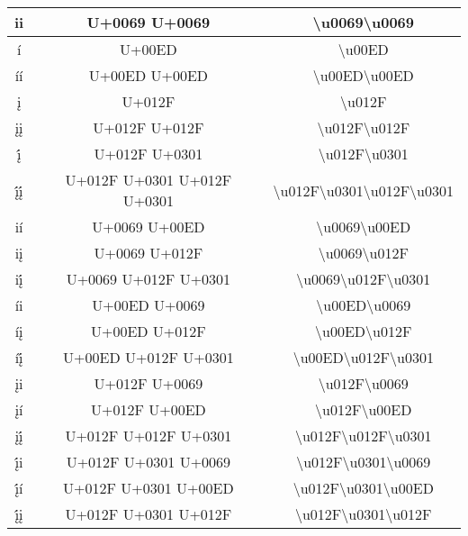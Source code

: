 \begin{longtable}{|c|c|c|}
ii & U+0069 U+0069  & \textbackslash{}u0069\textbackslash{}u0069 \\ \hline
í & U+00ED & \textbackslash{}u00ED \\ \hline
íí & U+00ED U+00ED & \textbackslash{}u00ED\textbackslash{}u00ED \\ \hline
į & U+012F & \textbackslash{}u012F \\ \hline
įį & U+012F U+012F & \textbackslash{}u012F\textbackslash{}u012F \\ \hline
į́ & U+012F U+0301 & \textbackslash{}u012F\textbackslash{}u0301 \\ \hline
į́į́ & U+012F U+0301 U+012F U+0301 & \textbackslash{}u012F\textbackslash{}u0301\textbackslash{}u012F\textbackslash{}u0301 \\ \hline

ií & U+0069 U+00ED & \textbackslash{}u0069\textbackslash{}u00ED \\ \hline
iį & U+0069 U+012F & \textbackslash{}u0069\textbackslash{}u012F \\ \hline
iį́ & U+0069 U+012F U+0301 & \textbackslash{}u0069\textbackslash{}u012F\textbackslash{}u0301 \\ \hline

íi & U+00ED U+0069 & \textbackslash{}u00ED\textbackslash{}u0069 \\ \hline
íį & U+00ED U+012F  & \textbackslash{}u00ED\textbackslash{}u012F \\ \hline
íį́ & U+00ED U+012F U+0301 & \textbackslash{}u00ED\textbackslash{}u012F\textbackslash{}u0301 \\ \hline

įi & U+012F U+0069 & \textbackslash{}u012F\textbackslash{}u0069 \\ \hline
įí & U+012F U+00ED & \textbackslash{}u012F\textbackslash{}u00ED \\ \hline
įį́ & U+012F U+012F U+0301 & \textbackslash{}u012F\textbackslash{}u012F\textbackslash{}u0301 \\ \hline

į́i & U+012F U+0301 U+0069 & \textbackslash{}u012F\textbackslash{}u0301\textbackslash{}u0069 \\ \hline
į́í & U+012F U+0301 U+00ED & \textbackslash{}u012F\textbackslash{}u0301\textbackslash{}u00ED \\ \hline
į́į & U+012F U+0301 U+012F & \textbackslash{}u012F\textbackslash{}u0301\textbackslash{}u012F \\ \hline


\end{longtable}
